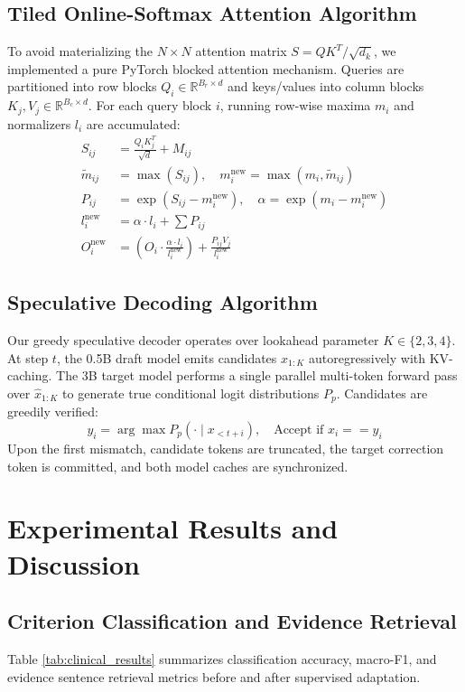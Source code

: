 \documentclass[conference]{IEEEtran}
\begin{document}
\subsection{Tiled Online-Softmax Attention Algorithm}
To avoid materializing the $N \times N$ attention matrix $S = QK^T / \sqrt{d_k}$, we implemented a pure PyTorch blocked attention mechanism. Queries are partitioned into row blocks $Q_i \in \mathbb{R}^{B_r \times d}$ and keys/values into column blocks $K_j, V_j \in \mathbb{R}^{B_c \times d}$. For each query block $i$, running row-wise maxima $m_i$ and normalizers $l_i$ are accumulated:
\begin{align}
    S_{ij} &= \frac{Q_i K_j^T}{\sqrt{d}} + M_{ij} \\
    \tilde{m}_{ij} &= \max(S_{ij}), \quad m_i^{\text{new}} = \max(m_i, \tilde{m}_{ij}) \\
    P_{ij} &= \exp(S_{ij} - m_i^{\text{new}}), \quad \alpha = \exp(m_i - m_i^{\text{new}}) \\
    l_i^{\text{new}} &= \alpha \cdot l_i + \sum P_{ij} \\
    O_i^{\text{new}} &= \left(O_i \cdot \frac{\alpha \cdot l_i}{l_i^{\text{new}}}\right) + \frac{P_{ij} V_j}{l_i^{\text{new}}}
\end{align}

\subsection{Speculative Decoding Algorithm}
Our greedy speculative decoder operates over lookahead parameter $K \in \{2, 3, 4\}$. At step $t$, the 0.5B draft model emits candidates $\hat{x}_{1:K}$ autoregressively with KV-caching. The 3B target model performs a single parallel multi-token forward pass over $\hat{x}_{1:K}$ to generate true conditional logit distributions $P_p$. Candidates are greedily verified:
\begin{equation}
    y_i = \arg\max P_p(\cdot \mid x_{<t+i}), \quad \text{Accept if } \hat{x}_i == y_i
\end{equation}
Upon the first mismatch, candidate tokens are truncated, the target correction token is committed, and both model caches are synchronized.

\section{Experimental Results and Discussion}

\subsection{Criterion Classification and Evidence Retrieval}
Table \ref{tab:clinical_results} summarizes classification accuracy, macro-F1, and evidence sentence retrieval metrics before and after supervised adaptation.
\end{document}
